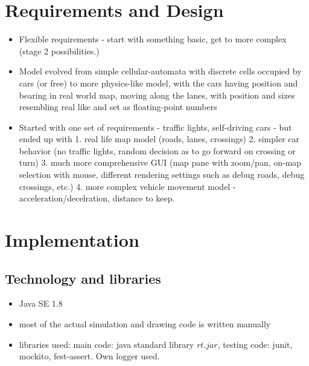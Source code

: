 \section{Requirements and Design}
\begin{itemize}
    \item Flexible requirements - start with something basic, get to more complex (stage 2 possibilities.)
    \item Model evolved from simple cellular-automata with discrete cells occupied by cars (or free) to more physics-like model, with the cars having position and bearing in real world map, moving along the lanes, with position and sizes resembling real like and set as floating-point numbers
    \item Started with one set of requirements - traffic lights, self-driving cars - but ended up with 1. real life map model (roads, lanes, crossings) 2. simpler car behavior (no traffic lights, random decision as to go forward on crossing or turn) 3. much more comprehensive GUI (map pane with zoom/pan, on-map selection with mouse, different rendering settings such as debug roads, debug crossings, etc.) 4. more complex vehicle movement model - acceleration/decelration, distance to keep.

\end{itemize}



\section{Implementation}

\subsection{Technology and libraries}
\begin{itemize}
    \item Java SE 1.8
    \item most of the actual simulation and drawing code is written manually
    \item libraries used: main code: java standard library \(rt.jar\), testing code: junit, mockito, fest-assert. Own logger used.
\end{itemize}


